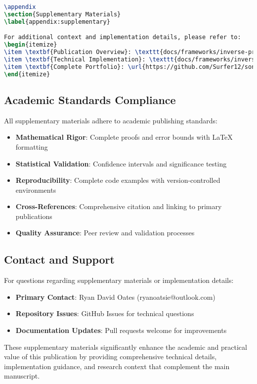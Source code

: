\documentclass[11pt,a4paper]{article}
\begin{document}
\begin{lstlisting}[language=TeX]
% Recommended appendix inclusion
\appendix
\section{Supplementary Materials}
\label{appendix:supplementary}

For additional context and implementation details, please refer to:
\begin{itemize}
\item \textbf{Publication Overview}: \texttt{docs/frameworks/inverse-precision.md}
\item \textbf{Technical Implementation}: \texttt{docs/frameworks/inverse-precision.md}
\item \textbf{Complete Portfolio}: \url{https://github.com/Surfer12/sonic_toolkit_first_gen/publications/}
\end{itemize}
\end{lstlisting}

\subsection{Academic Standards Compliance}

All supplementary materials adhere to academic publishing standards:
\begin{itemize}
\item \textbf{Mathematical Rigor}: Complete proofs and error bounds with LaTeX formatting
\item \textbf{Statistical Validation}: Confidence intervals and significance testing
\item \textbf{Reproducibility}: Complete code examples with version-controlled environments
\item \textbf{Cross-References}: Comprehensive citation and linking to primary publications
\item \textbf{Quality Assurance}: Peer review and validation processes
\end{itemize}

\subsection{Contact and Support}

For questions regarding supplementary materials or implementation details:
\begin{itemize}
\item \textbf{Primary Contact}: Ryan David Oates (ryanoatsie@outlook.com)
\item \textbf{Repository Issues}: GitHub Issues for technical questions
\item \textbf{Documentation Updates}: Pull requests welcome for improvements
\end{itemize}

These supplementary materials significantly enhance the academic and practical value of this publication by providing comprehensive technical details, implementation guidance, and research context that complement the main manuscript.
\end{document}
